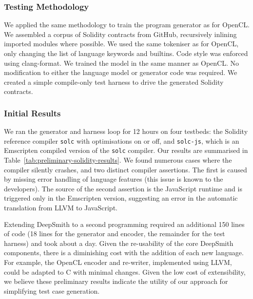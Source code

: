 \subsubsection{Testing Methodology}

We applied the same methodology to train the program generator as for OpenCL. We assembled a corpus of Solidity contracts from GitHub, recursively inlining imported modules where possible. We used the same tokeniser as for OpenCL, only changing the list of language keywords and builtins. Code style was enforced using clang-format. We trained the model in the same manner as OpenCL. No modification to either the language model or generator code was required. We created a simple compile-only test harness to drive the generated Solidity contracts.

\subsubsection{Initial Results}

We ran the generator and harness loop for 12 hours on four testbeds: the Solidity reference compiler \texttt{solc} with optimisations on or off, and \texttt{solc-js}, which is an Emscripten compiled version of the \texttt{solc} compiler. Our results are summarised in Table~\ref{tab:preliminary-solidity-results}. We found numerous cases where the compiler silently crashes, and two distinct compiler assertions. The first is caused by missing error handling of language features (this issue is known to the developers). The source of the second assertion is the JavaScript runtime and is triggered only in the Emscripten version, suggesting an error in the automatic translation from LLVM to JavaScript.

Extending DeepSmith to a second programming required an additional 150 lines of code (18 lines for the generator and encoder, the remainder for the test harness) and took about a day. Given the re-usability of the core DeepSmith components, there is a diminishing cost with the addition of each new language. For example, the OpenCL encoder and re-writer, implemented using LLVM, could be adapted to C with minimal changes. Given the low cost of extensibility, we believe these preliminary results indicate the utility of our approach for simplifying test case generation.
